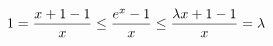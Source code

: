 \documentclass[preview]{standalone}
\begin{document}
\begin{align*}
\special{dvisvgm:raw <g id='unique000'>}1 = \frac{x + 1 - 1}{x} \leq \frac{e^x - 1}{x} \leq \frac{\lambda x + 1 - 1}{x} = \lambda\special{dvisvgm:raw </g>}
\end{align*}
\end{document}
